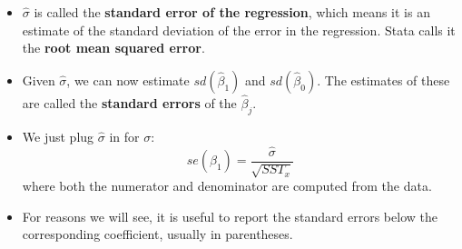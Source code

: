 \documentclass[notes=show]{beamer}
\begin{document}
\begin{frame}[plain]
 \begin{itemize}
  \item $\hat{\sigma}$ is called the \textbf{standard error of the regression}, which means it is an estimate of the standard deviation of the error in the regression. Stata calls it the \textbf{root mean squared error}.

  \item Given $\hat{\sigma}$, we can now estimate $sd(\hat{\beta}_{1})$ and $sd(\hat{\beta}_{0})$. The estimates of these are called the \textbf{standard errors} of the $\hat{\beta}_{j}$. 

 \end{itemize}
\end{frame}

\begin{frame}[plain]
 \begin{itemize}
  \item We just plug $\hat{\sigma}$ in for $\sigma $:
 \begin{equation}
  se(\hat{\beta}_{1})=\frac{\hat{\sigma}}{\sqrt{SST_{x}}}
 \end{equation}
where both the numerator and denominator are computed from the data.

  \item For reasons we will see, it is useful to report the standard errors below the corresponding coefficient, usually in parentheses.
 \end{itemize}
\end{frame}
\end{document}
